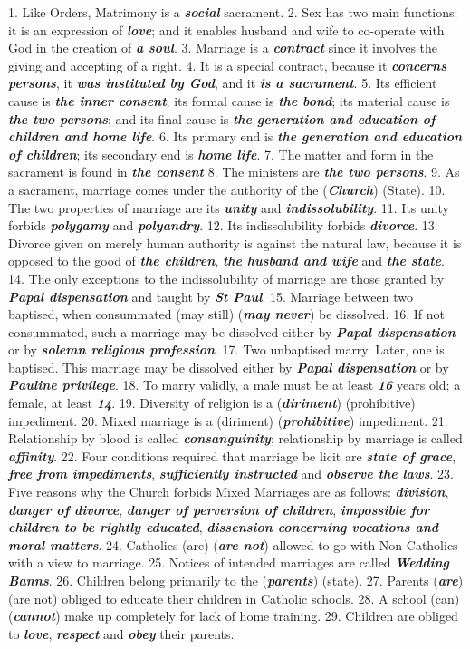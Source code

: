 \documentclass[a4paper,14pt]{memoir}
\newcommand\answer[1]{\textbf{\textit{#1}}}
\begin{document}
1. Like Orders, Matrimony is  a  \answer{social}  sacrament. 
2.  Sex  has  two  main
functions: it is an expression of \answer{love}; and it enables husband and  wife
to co-operate with God in the creation of \answer{a soul}.
3. Marriage is a  \answer{contract}
since it involves the giving and accepting of a right.
4. It  is  a  special
contract, because it \answer{concerns persons}, it \answer{was instituted by God}, and it  \answer{is a sacrament}. 
5.  Its
efficient  cause  is  \answer{the inner consent};  its  formal  cause  is  \answer{the bond};  its
material cause is \answer{the two persons}; and its final  cause  is  \answer{the generation and education of children and home life}. 
6.  Its
primary end is \answer{the generation and education of children}; its secondary end is \answer{home life}. 
7.  The  matter
and form in the  sacrament  is  found  in  \answer{the consent} 
8.  The  ministers  are
\answer{the two persons}.
9. As a sacrament, marriage comes  under  the  authority  of  the
(\answer{Church}) (State).
10. The two properties of marriage are its \answer{unity}  and
\answer{indissolubility}. 
11.  Its  unity  forbids  \answer{polygamy}  and  \answer{polyandry}.  
12.   Its
indissolubility forbids  \answer{divorce}. 
13.  Divorce  given  on  merely  human
authority is against the natural law, because it is opposed to the  good  of
\answer{the children},  \answer{the husband and wife}  and  \answer{the state}. 
14.  The  only  exceptions   to   the
indissolubility of marriage are those granted by  \answer{Papal dispensation}  and  taught  by
\answer{St Paul}.
15. Marriage between two baptised, when  consummated  (may  still)
(\answer{may never}) be dissolved.
16. If not consummated, such  a  marriage  may  be
dissolved either by \answer{Papal dispensation} or by \answer{solemn religious profession}. 
17.  Two  unbaptised  marry.
Later, one is baptised. This marriage may be dissolved either by  \answer{Papal dispensation}
or by \answer{Pauline privilege}.
18. To marry validly, a  male  must  be  at  least  \answer{16}
years old; a female, at least \answer{14}. 
19.  Diversity  of  religion  is  a
(\answer{diriment}) (prohibitive) impediment.
20.  Mixed  marriage  is  a  (diriment)
(\answer{prohibitive}) impediment.
21. Relationship  by  blood  is  called  \answer{consanguinity};
relationship by marriage is called \answer{affinity}.
22. Four  conditions  required
that marriage be licit are \answer{state of grace}, \answer{free from impediments},  \answer{sufficiently instructed}  and  \answer{observe the laws}.
23. Five reasons why the Church forbids  Mixed  Marriages  are  as  follows:
\answer{division}, \answer{danger of divorce}, \answer{danger of perversion of children}, \answer{impossible for children to be rightly educated}, \answer{dissension concerning vocations and moral matters}.
24. Catholics (are)  (\answer{are
not}) allowed to go with Non-Catholics with a view to marriage. 
25.  Notices
of intended marriages are called \answer{Wedding Banns}.
26. Children belong primarily  to
the (\answer{parents}) (state).
27. Parents (\answer{are}) (are not) obliged to educate  their
children  in  Catholic  schools. 
28.  A  school  (can)  (\answer{cannot})  make   up
completely  for  lack  of  home  training. 
29.  Children  are  obliged   to
\answer{love}, \answer{respect} and \answer{obey} their parents.
\end{document}
